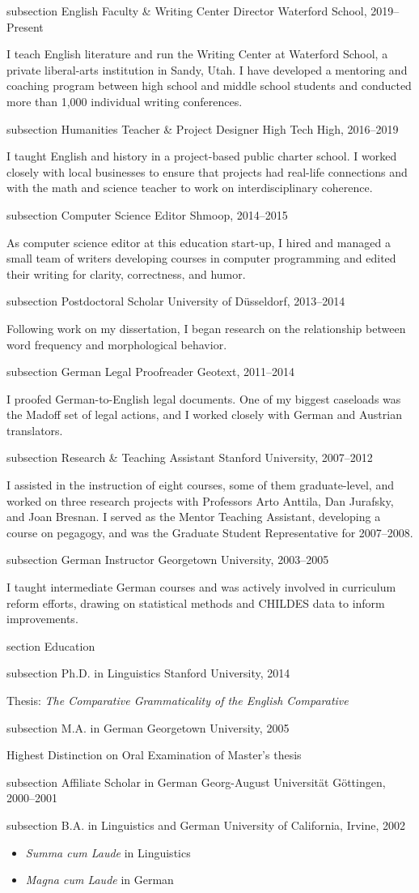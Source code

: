 \documentclass[10pt]{article}
\newcommand{\sectionhead}[1]{%
\begin{bgbox}{section}%
{\Large \textsf{#1}}%
\end{bgbox}%
}
\newcommand{\subsectionhead}[1]{%
\begin{bgbox}{subsection}%
{\small \textsf{#1}}%
\end{bgbox}%
}
\begin{document}
\begin{sloppypar}
\begin{paracol}{2}
\subsectionhead{English Faculty \& Writing Center Director \hfill Waterford School, 2019--Present}
\label{}
I teach English literature and run the Writing Center at Waterford School, a private liberal-arts institution in Sandy, Utah. I have developed a mentoring and coaching program between high school and middle school students and conducted more than 1,000 individual writing conferences.
\subsectionhead{Humanities Teacher \& Project Designer \hfill High Tech High, 2016--2019}
\label{}
I taught English and history in a project-based public charter school. I worked closely with local businesses to ensure that projects had real-life connections and with the math and science teacher to work on interdisciplinary coherence.
\subsectionhead{Computer Science Editor \hfill Shmoop, 2014--2015}
\label{computer-science-editor}
As computer science editor at this education start-up, I hired and managed a small team of writers developing courses in computer programming and edited their writing for clarity, correctness, and humor.
\subsectionhead{Postdoctoral Scholar \hfill University of Düsseldorf, 2013--2014}
\label{sec:orge7ac019}
Following work on my dissertation, I began research on the relationship between word frequency and morphological behavior.
\subsectionhead{German Legal Proofreader \hfill Geotext, 2011--2014}
\label{Geotext}
I proofed German-to-English legal documents. One of my biggest caseloads was the Madoff set of legal actions, and I worked closely with German and Austrian translators.
\subsectionhead{Research \& Teaching Assistant \hfill Stanford University, 2007--2012}
\label{research-teaching-asst}
I assisted in the instruction of eight courses, some of them graduate-level, and worked on three research projects with Professors Arto Anttila, Dan Jurafsky, and Joan Bresnan. I served as the Mentor Teaching Assistant, developing a course on pegagogy, and was the Graduate Student Representative for 2007--2008.
\subsectionhead{German Instructor \hfill Georgetown University, 2003--2005}
\label{german-instructor}
I taught intermediate German courses and was actively involved in curriculum reform efforts, drawing on statistical methods and CHILDES data to inform improvements.
\sectionhead{Education}
\label{Education}
\subsectionhead{Ph.D. in Linguistics \hfill Stanford University, 2014}
\label{}
Thesis: \emph{The Comparative Grammaticality of the English Comparative}
\subsectionhead{M.A. in German \hfill Georgetown University, 2005}
\label{M.Sc. in-Computer-Science}
Highest Distinction on Oral Examination of Master's thesis
\subsectionhead{Affiliate Scholar in German \hfill Georg-August Universität Göttingen, 2000--2001}
\label{Affilate-Scholar}

\subsectionhead{B.A. in Linguistics and German \hfill University of California, Irvine, 2002}
\label{B.A.-German-Linguistics}
\begin{itemize}
\item \emph{Summa cum Laude} in Linguistics
\item \emph{Magna cum Laude} in German
\end{itemize}

\end{paracol}
\end{sloppypar}
\end{document}
